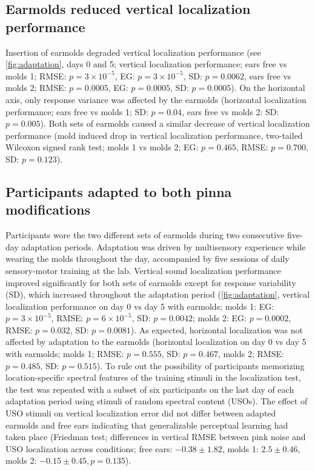 \subsection{Earmolds reduced vertical localization performance}

Insertion of earmolds degraded vertical localization performance (see \cref{fig:adaptation}, days 0 and 5; vertical localization performance; ears free vs molds 1; RMSE: $p = 3  \times 10^{-5}$, EG: $p = 3 \times 10^{-5}$, SD: $p = 0.0062$, ears free vs molds 2; RMSE: $p = 0.0005$, EG: $p = 0.0005$, SD: $p = 0.0005$). On the horizontal axis, only response variance was affected by the earmolds (horizontal localization performance; ears free vs molds 1; SD: $p = 0.04$, ears free vs molds 2: SD: $p = 0.005$). Both sets of earmolds caused a similar decrease of vertical localization performance (mold induced drop in vertical localization performance, two-tailed Wilcoxon signed rank test; molds 1 vs molds 2; EG: $p = 0.465$, RMSE: $p = 0.700$, SD: $p = 0.123$).

 
\subsection{Participants adapted to both pinna modifications}
 
Participants wore the two different sets of earmolds during two consecutive five-day adaptation periods. Adaptation was driven by multisensory experience while wearing the molds throughout the day, accompanied by five sessions of daily sensory-motor training at the lab. Vertical sound localization performance improved significantly for both sets of earmolds except for response variability (SD), which increased throughout the adaptation period (\cref{fig:adaptation}, vertical localization performance on day 0 vs day 5 with earmolds; molds 1: EG: $p = 3 \times 10^{-5}$, RMSE: $p = 6 \times 10^{-5}$, SD: $p = 0.0042$; molds 2: EG: $p = 0.0002$, RMSE: $p = 0.032$, SD: $p = 0.0081$). As expected, horizontal localization was not affected by adaptation to the earmolds (horizontal localization on day 0 vs day 5 with earmolds; molds 1; RMSE: $p = 0.555$, SD: $p = 0.467$, molds 2; RMSE: $p = 0.485$, SD: $p = 0.515$). %
To rule out the possibility of participants memorizing location-specific spectral features of the training stimuli in the localization test, the test was repeated with a subset of six participants on the last day of each adaptation period using stimuli of random spectral content (USOs). The effect of USO stimuli on vertical localization error did not differ between adapted earmolds and free ears indicating that generalizable perceptual learning had taken place (Friedman test; differences in vertical RMSE between pink noise and USO localization across conditions; free ears: $-0.38 \pm 1.82$, molds 1: $2.5 \pm 0.46$, molds 2: $-0.15 \pm 0.45, p = 0.135$).


